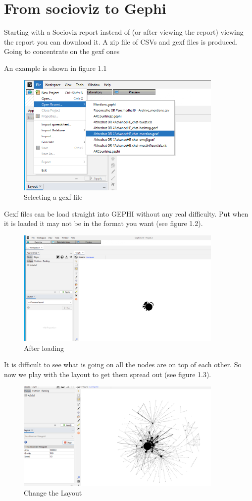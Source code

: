\chapter{From socioviz to Gephi}
Starting with a Socioviz report instead of (or after viewing the report) viewing the report you can download it. A zip file of CSVs and gexf files is produced. Going to concentrate on the gexf ones

An example is shown in figure 1.1
\begin{figure}
    \centering
    \includegraphics[width=10cm]{chapter/Chpsocioviz1/gephi1.png}
    \caption{Selecting a gexf file}
    \label{fig:GexfSelection}
\end{figure}
\newline
Gexf files can be load straight into GEPHI without any real difficulty. Put when it is loaded it may not be in the format you want (see figure 1.2). 
\begin{figure}
    \centering 
    \includegraphics[width=10cm]{chapter/Chpsocioviz1/gephi2.png}
    \caption{After loading}
    \label{fig:afterload}
\end{figure}
It is difficult to see what is going on all the nodes are on top of each other. So now we play with the layout to get them spread out (see figure 1.3).
\begin{figure}
    \centering
    \includegraphics[width=10cm]{chapter/Chpsocioviz1/gephi3.png}
    \caption{Change the Layout}
    \label{fig:layoutchange}
\end{figure}
